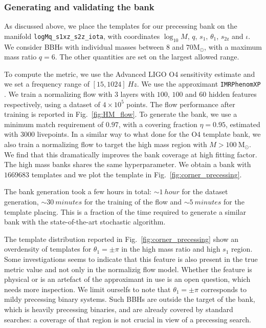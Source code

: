 \documentclass[twocolumn,showpacs,preprintnumbers,nofootinbib,prd,
superscriptaddress,10pt]{revtex4-2}
\begin{document}
\subsubsection{Generating and validating the bank}

As discussed above, we place the templates for our precessing bank on the manifold \texttt{logMq\_s1xz\_s2z\_iota}, with coordinates $\log_{10}M$, $q$, $s_\text{1}$, $\theta_\text{1}$, $s_\text{2z}$ and $\iota$.
We consider BBHs with individual masses between  $8$ and $70 \mathrm{M_\odot}$, with a maximum mass ratio $q = 6$.
The other quantities are set on the largest allowed range.

To compute the metric, we use the Advanced LIGO O4 sensitivity estimate \cite{O4_PSDs} and we set a frequency range of $[15, 1024] \SI{}{Hz}$. We use the approximant \texttt{IMRPhenomXP} \cite{Pratten:2020ceb}.
We train a normalizing flow with $3$ layers with $100$, $100$ and $60$ hidden features respectively, using a dataset of $4\times 10^5$ points.
The flow performance after training is reported in Fig.~\ref{fig:HM_flow}.
To generate the bank, we use a minimum match requirement of $0.97$, with a covering fraction $\eta = 0.95$, estimated with $3000$ livepoints.
In a similar way to what done for the O4 template bank, we also train a normalizing flow to target the high mass region with $M>\SI{100}{\mathrm{M_\odot}}$. We find that this dramatically improves the bank coverage at high fitting factor. The high mass banks shares the same hyperparameter.
We obtain a bank with $1669683$ templates and we plot the template in Fig.~\ref{fig:corner_precessing}.

The bank generation took a few hours in total: ${\sim \SI{1}{hour}}$ for the dataset generation, ${\sim \SI{30}{minutes}}$ for the training of the flow and ${\sim \SI{5}{minutes}}$ for the template placing. This is a fraction of the time required to generate a similar bank with the state-of-the-art stochastic algorithm.

The template distribution reported in Fig.~\ref{fig:corner_precessing} show an overdensity of templates for $\theta_1 = \pm\pi$ in the high mass ratio and high $s_1$ region. Some investigations seems to indicate that this feature is also present in the true metric value and not only in the normalizig flow model. Whether the feature is physical or is an artefact of the approximant in use is an open question, which needs more inspection.
We limit ourselfs to note that $\theta_1 = \pm\pi$ corresponds to mildy precessing binary systems. Such BBHs are outside the target of the bank, which is heavily precessing binaries, and are already covered by standard searches: a coverage of that region is not crucial in view of a precessing search.
\end{document}
